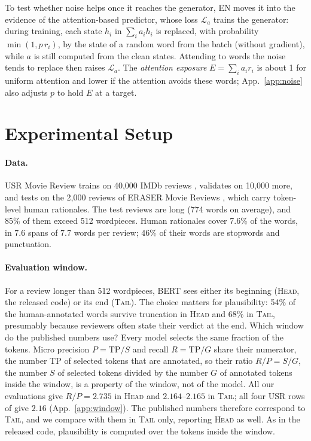 \documentclass[11pt]{article}
\newcommand{\HEAD}{\textup{\textsc{Head}}}
\newcommand{\TAIL}{\textup{\textsc{Tail}}}
\begin{document}
To test whether noise helps once it reaches the generator, EN moves it into the evidence of the attention-based predictor, whose loss $\mathcal{L}_a$ trains the generator: during training, each state $h_i$ in $\sum_i a_i h_i$ is replaced, with probability $\min(1, p\,r_i)$, by the state of a random word from the batch (without gradient), while $a$ is still computed from the clean states. Attending to words the noise tends to replace then raises $\mathcal{L}_a$. The \emph{attention exposure} $E = \sum_i a_i r_i$ is about 1 for uniform attention and lower if the attention avoids these words; App.~\ref{app:noise} also adjusts $p$ to hold $E$ at a target.

\section{Experimental Setup}
\label{sec:setup}

\paragraph{Data.}
USR Movie Review \citep{storek-etal-2023-unsupervised} trains on 40,000 IMDb reviews \citep{maas-etal-2011-learning}, validates on 10,000 more, and tests on the 2,000 reviews of ERASER Movie Reviews \citep{deyoung-etal-2020-eraser,zaidan-eisner-2008-modeling,pang-lee-2004-sentimental}, which carry token-level human rationales. The test reviews are long (774 words on average), and 85\% of them exceed 512 wordpieces. Human rationales cover 7.6\% of the words, in 7.6 spans of 7.7 words per review; 46\% of their words are stopwords and punctuation.

\paragraph{Evaluation window.}
\label{sec:protocol}
For a review longer than 512 wordpieces, BERT sees either its beginning (\HEAD, the released code) or its end (\TAIL). The choice matters for plausibility: 54\% of the human-annotated words survive truncation in \HEAD{} and 68\% in \TAIL, presumably because reviewers often state their verdict at the end. Which window do the published numbers use? Every model selects the same fraction of the tokens. Micro precision $P = \mathrm{TP}/S$ and recall $R = \mathrm{TP}/G$ share their numerator, the number TP of selected tokens that are annotated, so their ratio $R/P = S/G$, the number $S$ of selected tokens divided by the number $G$ of annotated tokens inside the window, is a property of the window, not of the model. All our evaluations give $R/P = 2.735$ in \HEAD{} and $2.164$--$2.165$ in \TAIL; all four USR rows of \citet{storek-etal-2023-unsupervised} give $2.16$ (App.~\ref{app:window}). The published numbers therefore correspond to \TAIL, and we compare with them in \TAIL{} only, reporting \HEAD{} as well. As in the released code, plausibility is computed over the tokens inside the window.
\end{document}

